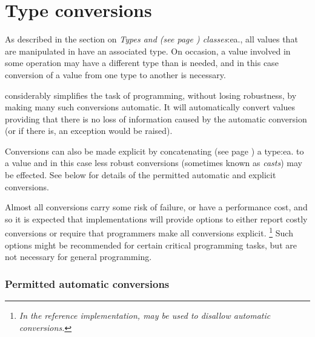 \chapter{Type conversions}\label{refconv}
 
As described in the section on  \emph{Types and (see page \pageref{reftypes}) 
classes}:ea., all values that are manipulated in \nr{} have an
associated type.  On occasion, a value involved in some operation may
have a different type than is needed, and in this case conversion of
a value from one type to another is necessary.
 
\nr{} considerably simplifies the task of programming, without losing
robustness, by making many such conversions automatic.  It will
automatically convert values providing that there is no loss of
information caused by the automatic conversion (or if there is, an
exception would be raised).
 
\index{,}
Conversions can also be made explicit by  concatenating (see page \pageref{reftypeops}) 
a type:ea. to a value and in this case less robust conversions
(sometimes known as \emph{casts}) may be effected.
See below for details of the permitted automatic and explicit
conversions.
 
Almost all conversions carry some risk of failure, or have a performance
cost, and so it is expected that implementations will provide options to
either report costly conversions or require that programmers make all
conversions explicit.
\footnote{
\emph{In the reference implementation,  may be
used to disallow automatic conversions.}
}
Such options might be recommended for certain critical programming
tasks, but are not necessary for general programming.
\subsection{Permitted automatic conversions}
 
